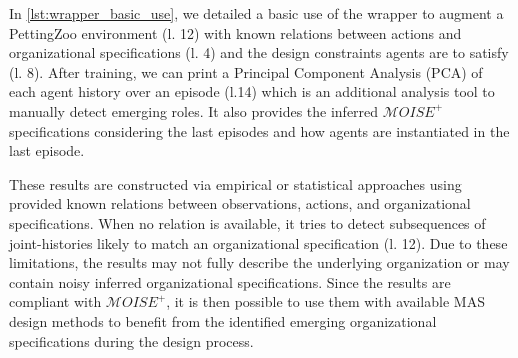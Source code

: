 \documentclass[runningheads]{llncs}
\newcounter{relation}
\begin{document}
In \autoref{lst:wrapper_basic_use}, we detailed a basic use of the wrapper to augment a PettingZoo environment (l. 12) with known relations between actions and organizational specifications (l. 4) and the design constraints agents are to satisfy (l. 8). After training, we can print a Principal Component Analysis (PCA) of each agent history over an episode (l.14) which is an additional analysis tool to manually detect emerging roles. It also provides the inferred $\mathcal{M}OISE^+$ specifications considering the last episodes and how agents are instantiated in the last episode.

These results are constructed via empirical or statistical approaches using provided known relations between observations, actions, and organizational specifications. When no relation is available, it tries to detect subsequences of joint-histories likely to match an organizational specification (l. 12). Due to these limitations, the results may not fully describe the underlying organization or may contain noisy inferred organizational specifications. Since the results are compliant with $\mathcal{M}OISE^+$, it is then possible to use them with available MAS design methods to benefit from the identified emerging organizational specifications during the design process.





\end{document}
